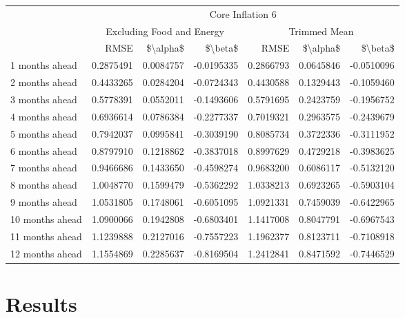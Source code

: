 \documentclass[
]{article}
\begin{document}
\begin{table}
\centering
\begin{tabular}[t]{l|r|r|r|r|r|r}
\hline
\multicolumn{1}{c|}{ } & \multicolumn{6}{c}{Core Inflation 6} \\
\cline{2-7}
\multicolumn{1}{c|}{ } & \multicolumn{3}{c|}{Excluding Food and Energy} & \multicolumn{3}{c}{Trimmed Mean} \\
\cline{2-4} \cline{5-7}
  & RMSE & \$\textbackslash{}alpha\$ & \$\textbackslash{}beta\$ & RMSE & \$\textbackslash{}alpha\$ & \$\textbackslash{}beta\$\\
\hline
1 months ahead & 0.2875491 & 0.0084757 & -0.0195335 & 0.2866793 & 0.0645846 & -0.0510096\\
\hline
2 months ahead & 0.4433265 & 0.0284204 & -0.0724343 & 0.4430588 & 0.1329443 & -0.1059460\\
\hline
3 months ahead & 0.5778391 & 0.0552011 & -0.1493606 & 0.5791695 & 0.2423759 & -0.1956752\\
\hline
4 months ahead & 0.6936614 & 0.0786384 & -0.2277337 & 0.7019321 & 0.2963575 & -0.2439679\\
\hline
5 months ahead & 0.7942037 & 0.0995841 & -0.3039190 & 0.8085734 & 0.3722336 & -0.3111952\\
\hline
6 months ahead & 0.8797910 & 0.1218862 & -0.3837018 & 0.8997629 & 0.4729218 & -0.3983625\\
\hline
7 months ahead & 0.9466686 & 0.1433650 & -0.4598274 & 0.9683200 & 0.6086117 & -0.5132120\\
\hline
8 months ahead & 1.0048770 & 0.1599479 & -0.5362292 & 1.0338213 & 0.6923265 & -0.5903104\\
\hline
9 months ahead & 1.0531805 & 0.1748061 & -0.6051095 & 1.0921331 & 0.7459039 & -0.6422965\\
\hline
10 months ahead & 1.0900066 & 0.1942808 & -0.6803401 & 1.1417008 & 0.8047791 & -0.6967543\\
\hline
11 months ahead & 1.1239888 & 0.2127016 & -0.7557223 & 1.1962377 & 0.8123711 & -0.7108918\\
\hline
12 months ahead & 1.1554869 & 0.2285637 & -0.8169504 & 1.2412841 & 0.8471592 & -0.7446529\\
\hline
\end{tabular}
\end{table}

\hypertarget{results}{%
\section{Results}\label{results}}
\end{document}
